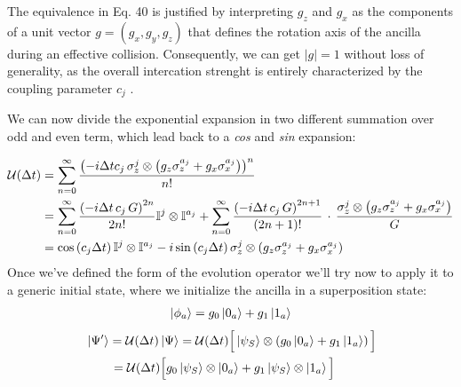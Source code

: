 \documentclass[a4paper,12pt]{article}
\begin{document}
	\begin{flushleft}
		The equivalence in Eq. 40 is justified by interpreting $ g_z $ and $ g_x $ as the components of a unit vector $ g = \left(g_x, g_y, g_z \right) $ that defines the rotation axis of the ancilla during an effective collision. Consequently, we can get $ |g| = 1 $ without loss of generality, as the overall intercation strenght is entirely characterized by the coupling parameter $ c_j $ .
	\end{flushleft}

	\begin{flushleft}
		We can now divide the exponential expansion in two different summation over odd  and even term, which lead back to a \textit{cos} and \textit{sin} expansion:
	\end{flushleft}

	\begin{align}
		\mathcal{U}(\Delta t) &= \sum_{n=0}^{\infty}{\frac{\left(-i \Delta t c_{j} \, \sigma_{z}^{j} \otimes \left(g_{z} \sigma_{z}^{a_j} + g_{x} \sigma_{x}^{a_j} \right) \right)^n}{n!}} \notag \\
		&= \sum_{n=0}^{\infty}{\frac{\left(-i \Delta t \, c_{j} \, G \right)^{2n}}{2n!} \mathbb{I}^{j} \otimes \mathbb{I}^{a_j} } + \sum_{n=0}^{\infty}{\frac{\left(-i \Delta t \, c_{j} \, G \right)^{2n+1}}{(2n+1)!} \, \cdot \, \frac{\sigma_{z}^{j} \otimes \left(g_{z} \sigma_{z}^{a_j} + g_{x} \sigma_{x}^{a_j} \right)}{G} } \notag \\
		&= \cos{\left(c_{j} \Delta t \right)} \, \mathbb{I}^{j} \otimes \mathbb{I}^{a_j} -i \sin{\left(c_{j} \Delta t \right)} \, \sigma_{z}^{j} \otimes \left(g_{z} \sigma_{z}^{a_j} + g_{x} \sigma_{x}^{a_j} \right)
	\end{align}
	Once we've defined the form of the evolution operator we'll try now to apply it to a generic initial state, where we initialize the ancilla in a superposition state:
	\begin{gather}
		\ket{\phi_{a}} = g_{0} \ket{0_a} + g_{1}\ket{1_a}
		\label{eq:anc_iniz}
	\end{gather}
	\begin{align}
		&\ket{\Psi'} = \mathcal{U}(\Delta t)\ket{\Psi} = \mathcal{U}(\Delta t)\Big[ \ket{\psi_S} \otimes \left(g_{0} \ket{0_a} + g_{1}\ket{1_a} \right) \Big] \notag \\
		&\qquad = \mathcal{U}(\Delta t)\Big[ g_{0} \ket{\psi_S} \otimes \ket{0_a} + g_{1} \ket{\psi_S} \otimes \ket{1_a} \Big]
		\label{eq:psi_evo}
	\end{align}
\end{document}
